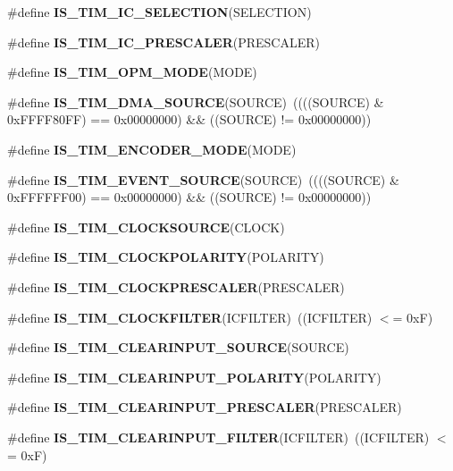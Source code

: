 \begin{DoxyCompactItemize}
\#define {\bfseries I\+S\+\_\+\+T\+I\+M\+\_\+\+I\+C\+\_\+\+S\+E\+L\+E\+C\+T\+I\+ON}(S\+E\+L\+E\+C\+T\+I\+ON)
\item 
\#define {\bfseries I\+S\+\_\+\+T\+I\+M\+\_\+\+I\+C\+\_\+\+P\+R\+E\+S\+C\+A\+L\+ER}(P\+R\+E\+S\+C\+A\+L\+ER)
\item 
\#define {\bfseries I\+S\+\_\+\+T\+I\+M\+\_\+\+O\+P\+M\+\_\+\+M\+O\+DE}(M\+O\+DE)
\item 
\#define {\bfseries I\+S\+\_\+\+T\+I\+M\+\_\+\+D\+M\+A\+\_\+\+S\+O\+U\+R\+CE}(S\+O\+U\+R\+CE)~((((S\+O\+U\+R\+CE) \& 0x\+F\+F\+F\+F80\+F\+F) == 0x00000000) \&\& ((\+S\+O\+U\+R\+C\+E) != 0x00000000))\hypertarget{group___t_i_m___i_s___t_i_m___definitions_gafb9cb1995ea4cd37db6032d80a49cd47}{}\label{group___t_i_m___i_s___t_i_m___definitions_gafb9cb1995ea4cd37db6032d80a49cd47}

\item 
\#define {\bfseries I\+S\+\_\+\+T\+I\+M\+\_\+\+E\+N\+C\+O\+D\+E\+R\+\_\+\+M\+O\+DE}(M\+O\+DE)
\item 
\#define {\bfseries I\+S\+\_\+\+T\+I\+M\+\_\+\+E\+V\+E\+N\+T\+\_\+\+S\+O\+U\+R\+CE}(S\+O\+U\+R\+CE)~((((S\+O\+U\+R\+CE) \& 0x\+F\+F\+F\+F\+F\+F00) == 0x00000000) \&\& ((\+S\+O\+U\+R\+C\+E) != 0x00000000))\hypertarget{group___t_i_m___i_s___t_i_m___definitions_ga4ac88c3e43c8250114ea81a6e052d58a}{}\label{group___t_i_m___i_s___t_i_m___definitions_ga4ac88c3e43c8250114ea81a6e052d58a}

\item 
\#define {\bfseries I\+S\+\_\+\+T\+I\+M\+\_\+\+C\+L\+O\+C\+K\+S\+O\+U\+R\+CE}(C\+L\+O\+CK)
\item 
\#define {\bfseries I\+S\+\_\+\+T\+I\+M\+\_\+\+C\+L\+O\+C\+K\+P\+O\+L\+A\+R\+I\+TY}(P\+O\+L\+A\+R\+I\+TY)
\item 
\#define {\bfseries I\+S\+\_\+\+T\+I\+M\+\_\+\+C\+L\+O\+C\+K\+P\+R\+E\+S\+C\+A\+L\+ER}(P\+R\+E\+S\+C\+A\+L\+ER)
\item 
\#define {\bfseries I\+S\+\_\+\+T\+I\+M\+\_\+\+C\+L\+O\+C\+K\+F\+I\+L\+T\+ER}(I\+C\+F\+I\+L\+T\+ER)~((I\+C\+F\+I\+L\+T\+ER) $<$= 0x\+F)\hypertarget{group___t_i_m___i_s___t_i_m___definitions_gaf1c65e593d3aabc6f7288108cb75aab7}{}\label{group___t_i_m___i_s___t_i_m___definitions_gaf1c65e593d3aabc6f7288108cb75aab7}

\item 
\#define {\bfseries I\+S\+\_\+\+T\+I\+M\+\_\+\+C\+L\+E\+A\+R\+I\+N\+P\+U\+T\+\_\+\+S\+O\+U\+R\+CE}(S\+O\+U\+R\+CE)
\item 
\#define {\bfseries I\+S\+\_\+\+T\+I\+M\+\_\+\+C\+L\+E\+A\+R\+I\+N\+P\+U\+T\+\_\+\+P\+O\+L\+A\+R\+I\+TY}(P\+O\+L\+A\+R\+I\+TY)
\item 
\#define {\bfseries I\+S\+\_\+\+T\+I\+M\+\_\+\+C\+L\+E\+A\+R\+I\+N\+P\+U\+T\+\_\+\+P\+R\+E\+S\+C\+A\+L\+ER}(P\+R\+E\+S\+C\+A\+L\+ER)
\item 
\#define {\bfseries I\+S\+\_\+\+T\+I\+M\+\_\+\+C\+L\+E\+A\+R\+I\+N\+P\+U\+T\+\_\+\+F\+I\+L\+T\+ER}(I\+C\+F\+I\+L\+T\+ER)~((I\+C\+F\+I\+L\+T\+ER) $<$= 0x\+F)\hypertarget{group___t_i_m___i_s___t_i_m___definitions_gac46ddca5cf26c731771dc3bc3cb724e9}{}\label{group___t_i_m___i_s___t_i_m___definitions_gac46ddca5cf26c731771dc3bc3cb724e9}


\end{DoxyCompactItemize}
